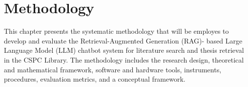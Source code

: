 
\chapter{Methodology}
\begin{refsection}
 
This chapter presents the systematic methodology that will be employes to develop and evaluate the Retrieval-Augmented Generation (RAG)- based Large Language Model (LLM) chatbot system for literature search and thesis retrieval in the CSPC Library. The methodology includes the research design, theoretical and mathematical framework, software and hardware tools, instruments, procedures, evaluation metrics, and a conceptual framework.


\clearpage

\printbibliography[heading=subbibintoc, title={\centering Notes}]
\end{refsection}